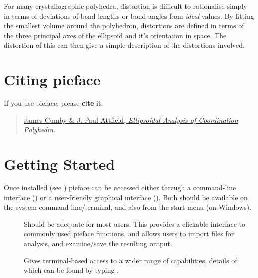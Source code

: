 \documentclass[a4paper,10pt,openany, oneside]{sphinxmanual}
\begin{document}
For many crystallographic polyhedra, distortion is difficult to rationalise simply in terms of deviations of bond lengths or bond angles from \emph{ideal} values. By fitting the smallest volume {\hyperref[glossary:term\string-ellipsoid]{}}
around the polyhedron, distortions are defined in terms of the three principal axes of the ellipsoid and it's orientation in space. The distortion of this {\hyperref[glossary:term\string-ellipsoid]{}} can then give a simple description
of the distortions involved.


\section{Citing pieface}
\label{introduction:citing-pieface}
If you use pieface, please \textbf{cite} it:
\begin{quote}

\href{http://www.csec.ed.ac.uk}{James Cumby \& J. Paul Attfield, \emph{Ellipsoidal Analysis of Coordination Polyhedra}.}
\end{quote}


\section{Getting Started}
\label{introduction:getting-started}
Once installed (see {\hyperref[installation:installation]{}}) pieface can be accessed either through a command-line interface () or a user-friendly graphical interface ().
Both should be available on the system command line/terminal, and also from the start menu (on Windows).
\begin{description}
\item[{}] \leavevmode
Should be adequate for most users. This {\hyperref[glossary:term\string-gui]{}} provides a clickable interface to commonly used \href{http://www.csec.ed.ac.uk}{pieface} functions, and allows users to
import {\hyperref[glossary:term\string-cif]{}} files for analysis, and examine/save the resulting output.

\item[{}] \leavevmode
Gives terminal-based access to a wider range of capabilities, details of which can be found by typing  .

\end{description}
\end{document}
